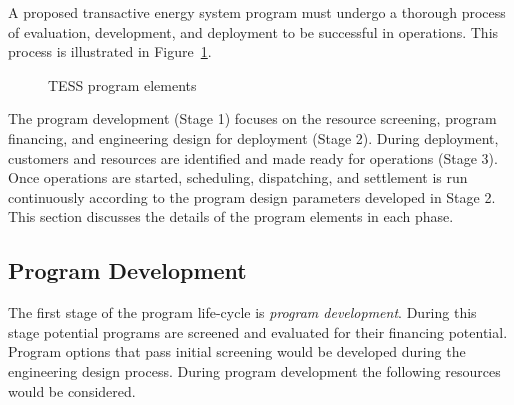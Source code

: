 \documentclass[10pt,twocolumn]{article}
\begin{document}
A proposed transactive energy system program must undergo a thorough process of evaluation, development, and deployment to be successful in operations.  This process is illustrated in Figure~\ref{fig:tess_program_elements}.
\begin{figure}[!t]
    \centerline { \scalebox{0.5} { }}
    \caption{TESS program elements}
    \label{fig:tess_program_elements}
\end{figure}
The program development (Stage 1) focuses on the resource screening, program financing, and engineering design for deployment (Stage 2).  During deployment, customers and resources are identified and made ready for operations (Stage 3).  Once operations are started, scheduling, dispatching, and settlement is run continuously according to the program design parameters developed in Stage 2. This section discusses the details of the program elements in each phase.

\subsection{Program Development}

The first stage of the program life-cycle is \textit{program development}. During this stage potential programs are screened and evaluated for their financing potential.  Program options that pass initial screening would be developed during the engineering design process. During program development the following resources would be considered.
\end{document}
